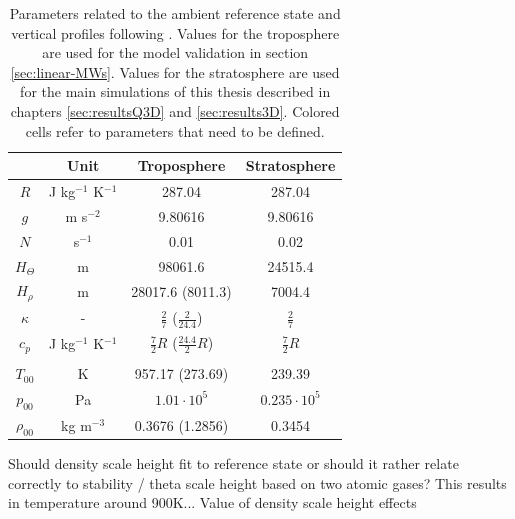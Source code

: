 \begin{table}[ht]
\centering
\caption{Parameters related to the ambient reference state and vertical profiles following \textcite[]{bacmeister_breakdown_1989}. Values for the troposphere are used for the model validation in section \ref{sec:linear-MWs}. Values for the stratosphere are used for the main simulations of this thesis described in chapters \ref{sec:resultsQ3D} and \ref{sec:results3D}. Colored cells refer to parameters that need to be defined.}

\begin{tabular}{@{}cccc@{}}
\toprule
 & Unit & Troposphere & Stratosphere \\ \midrule[1pt]

$R$ & J kg$^{-1}$ K$^{-1}$ &   \cellcolor{LightCyan} 287.04 &   \cellcolor{LightCyan} 287.04 \\
$g$ & m s$^{-2}$ & \cellcolor{LightCyan} 9.80616 & \cellcolor{LightCyan} 9.80616 \\
$N$ & s$^{-1}$ & \cellcolor{LightCyan} 0.01 & \cellcolor{LightCyan} 0.02 \\
$H_{\Theta}$ & m & 98061.6 & 24515.4  \\
$H_{\rho}$ & m & 28017.6 (8011.3)  & 7004.4 \\
$\kappa$ & - & $ \frac{2}{7}$ ($\frac{2}{24.4}$) & $ \frac{2}{7}$ \\
$c_p$ & J kg$^{-1}$ K$^{-1}$ & $\frac{7}{2} R$ ($\frac{24.4}{2} R$) & $\frac{7}{2} R$ \\

& & & \\
$T_{00}$ & K & \cellcolor{LightCyan} 957.17 (273.69) & 239.39 \\
$p_{00}$ & Pa &  \cellcolor{LightCyan} $1.01 \cdot 10^5$ & \cellcolor{LightCyan} $0.235 \cdot 10^5$ \\
$\rho_{00}$ & kg m$^{-3}$ & 0.3676 (1.2856) & 0.3454 \\


\bottomrule
\end{tabular}
\label{tab:ambientProfiles}
\end{table}

Should density scale height fit to reference state or should it rather relate correctly to stability / theta scale height based on two atomic gases? This results in temperature around 900K...
Value of density scale height effects

